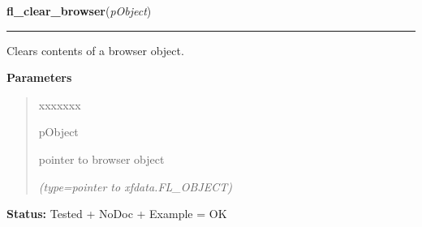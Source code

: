     \label{xformslib:library:fl_clear_browser}

    \vspace{0.5ex}

\hspace{.8\funcindent}\begin{boxedminipage}{\funcwidth}

    \raggedright \textbf{fl\_clear\_browser}(\textit{pObject})

    \vspace{-1.5ex}

    \rule{\textwidth}{0.5\fboxrule}
\setlength{\parskip}{2ex}
    Clears contents of a browser object.

\setlength{\parskip}{1ex}
      \textbf{Parameters}
      \vspace{-1ex}

      \begin{quote}
        \begin{Ventry}{xxxxxxx}

          \item[pObject]

          pointer to browser object

            {\it (type=pointer to xfdata.FL\_OBJECT)}

        \end{Ventry}

      \end{quote}

\textbf{Status:} Tested + NoDoc + Example = OK



    \end{boxedminipage}

    \label{xformslib:library:fl_add_browser_line}

    \vspace{0.5ex}

